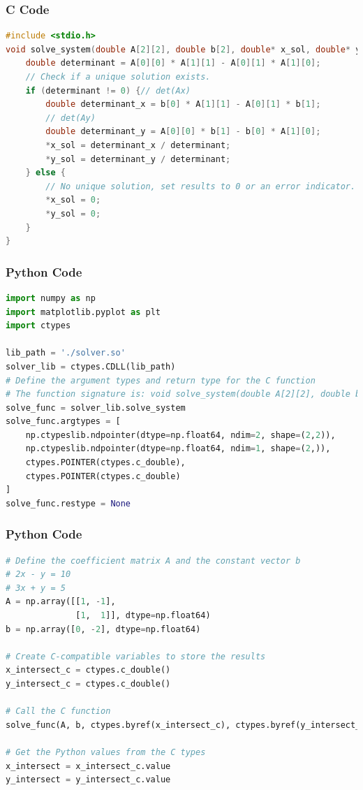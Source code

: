 \documentclass{beamer}
\begin{document}
\begin{frame}[fragile]
  \frametitle{C Code}
  \begin{lstlisting}[language=C]
#include <stdio.h>
void solve_system(double A[2][2], double b[2], double* x_sol, double* y_sol) {  // Solve the 2x2 system using Cramer's rule; det(A)
    double determinant = A[0][0] * A[1][1] - A[0][1] * A[1][0];
    // Check if a unique solution exists.
    if (determinant != 0) {// det(Ax)
        double determinant_x = b[0] * A[1][1] - A[0][1] * b[1];
        // det(Ay)
        double determinant_y = A[0][0] * b[1] - b[0] * A[1][0];
        *x_sol = determinant_x / determinant;
        *y_sol = determinant_y / determinant;
    } else {
        // No unique solution, set results to 0 or an error indicator.
        *x_sol = 0;
        *y_sol = 0;
    }
}
  \end{lstlisting}
\end{frame}

\begin{frame}[fragile]
  \frametitle{Python Code}
  \begin{lstlisting}[language=Python]
import numpy as np
import matplotlib.pyplot as plt
import ctypes

lib_path = './solver.so'
solver_lib = ctypes.CDLL(lib_path)
# Define the argument types and return type for the C function
# The function signature is: void solve_system(double A[2][2], double b[2], double* x, double* y)
solve_func = solver_lib.solve_system
solve_func.argtypes = [
    np.ctypeslib.ndpointer(dtype=np.float64, ndim=2, shape=(2,2)),
    np.ctypeslib.ndpointer(dtype=np.float64, ndim=1, shape=(2,)),
    ctypes.POINTER(ctypes.c_double),
    ctypes.POINTER(ctypes.c_double)
]
solve_func.restype = None
  \end{lstlisting}
\end{frame}

\begin{frame}[fragile]
  \frametitle{Python Code}
  \begin{lstlisting}[language=Python]
# Define the coefficient matrix A and the constant vector b
# 2x - y = 10
# 3x + y = 5
A = np.array([[1, -1],
              [1,  1]], dtype=np.float64)
b = np.array([0, -2], dtype=np.float64)

# Create C-compatible variables to store the results
x_intersect_c = ctypes.c_double()
y_intersect_c = ctypes.c_double()

# Call the C function
solve_func(A, b, ctypes.byref(x_intersect_c), ctypes.byref(y_intersect_c))

# Get the Python values from the C types
x_intersect = x_intersect_c.value
y_intersect = y_intersect_c.value
   \end{lstlisting}
\end{frame}
\end{document}
